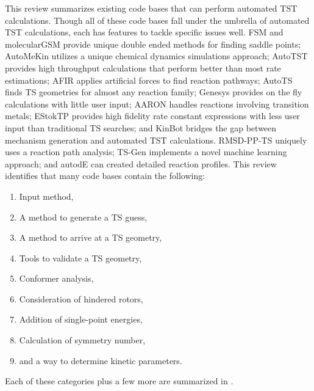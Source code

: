 \documentclass[preprint, 11pt]{elsarticle} %
\begin{document}
This review summarizes existing code bases that can perform automated TST calculations.
Though all of these code bases fall under the umbrella of automated TST calculations, each has features to tackle specific issues well.
FSM and molecularGSM provide unique double ended methods for finding saddle points; AutoMeKin utilizes a unique chemical dynamics simulations approach; AutoTST provides high throughput calculations that perform better than most rate estimations; AFIR applies artificial forces to find reaction pathways; AutoTS finds TS geometries for almost any reaction family; Genesys provides on the fly calculations with little user input; AARON handles reactions involving transition metals; EStokTP provides high fidelity rate constant expressions with less user input than traditional TS searches; and KinBot bridges the gap between mechanism generation and automated TST calculations. 
RMSD-PP-TS uniquely uses a reaction path analysis; TS-Gen implements a novel machine learning approach; and autodE can created detailed reaction profiles. 
This review identifies that many code bases contain the following:
\begin{enumerate}
    \item Input method,
    \item A method to generate a TS guess,
    \item A method to arrive at a TS geometry,
    \item Tools to validate a TS geometry,
    \item Conformer analysis,
    \item Consideration of hindered rotors,
    \item Addition of single-point energies,
    \item Calculation of symmetry number,
    \item and a way to determine kinetic parameters.
\end{enumerate}

Each of these categories plus a few more are summarized in .
\end{document}

